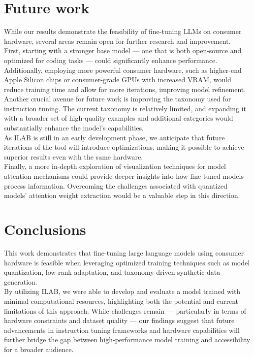 \documentclass[12pt]{article}
\begin{document}
\section{Future work}
While our results demonstrate the feasibility of fine-tuning LLMs on consumer hardware, several areas remain open for further research and improvement.\\
First, starting with a stronger base model — one that is both open-source and optimized for coding tasks — could significantly enhance performance. Additionally, employing more powerful consumer hardware, such as higher-end Apple Silicon chips or consumer-grade GPUs with increased VRAM, would reduce training time and allow for more iterations, improving model refinement.\vspace{14pt}\\
Another crucial avenue for future work is improving the taxonomy used for instruction tuning. The current taxonomy is relatively limited, and expanding it with a broader set of high-quality examples and additional categories would substantially enhance the model's capabilities.\vspace{14pt}\\
As ILAB is still in an early development phase, we anticipate that future iterations of the tool will introduce optimizations, making it possible to achieve superior results even with the same hardware.\vspace{14pt}\\
Finally, a more in-depth exploration of visualization techniques for model attention mechanisms could provide deeper insights into how fine-tuned models process information. Overcoming the challenges associated with quantized models’ attention weight extraction would be a valuable step in this direction.

\section{Conclusions}
This work demonstrates that fine-tuning large language models using consumer hardware is feasible when leveraging optimized training techniques such as model quantization, low-rank adaptation, and taxonomy-driven synthetic data generation.\\
By utilizing ILAB, we were able to develop and evaluate a model trained with minimal computational resources, highlighting both the potential and current limitations of this approach. While challenges remain — particularly in terms of hardware constraints and dataset quality — our findings suggest that future advancements in instruction tuning frameworks and hardware capabilities will further bridge the gap between high-performance model training and accessibility for a broader audience.

\pagebreak


\end{document}
